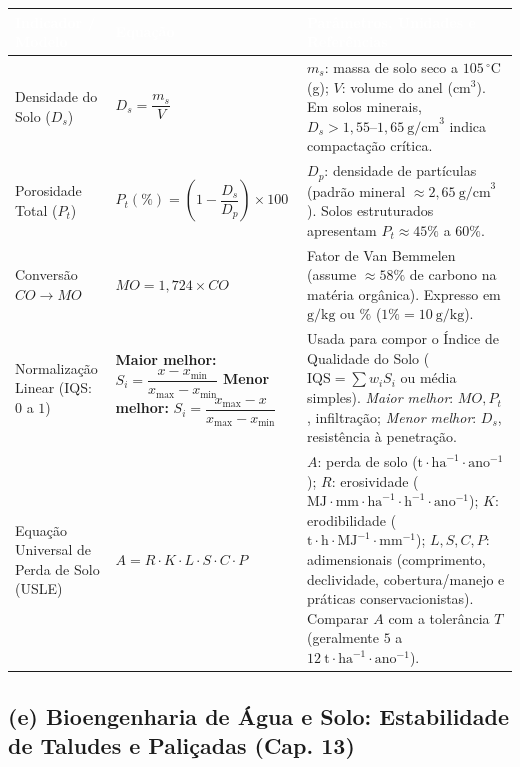 \begin{center}
\renewcommand{\arraystretch}{1.30}
\small
\begin{tabularx}{\textwidth}{@{}p{3.4cm} p{4.8cm} >{\raggedright\arraybackslash}X@{}}
  \toprule
  \rowcolor{uefsNavy}
  \textcolor{white}{\bfseries Indicador / Modelo} & \textcolor{white}{\bfseries Equação} & \textcolor{white}{\bfseries Parâmetros, Unidades e Referências} \\
  \midrule
  Densidade do Solo ($D_s$) & $D_s = \dfrac{m_s}{V}$ & $m_s$: massa de solo seco a $105\,^\circ\text{C}$ (g); $V$: volume do anel ($\text{cm}^3$). Em solos minerais, $D_s > 1,55\text{--}1,65\ \text{g/cm}^3$ indica compactação crítica. \\
  \rowcolor{bgGray}
  Porosidade Total ($P_t$) & $P_t(\%) = \left(1 - \dfrac{D_s}{D_p}\right)\times 100$ & $D_p$: densidade de partículas (padrão mineral $\approx 2,65\ \text{g/cm}^3$). Solos estruturados apresentam $P_t \approx 45\%$ a $60\%$. \\
  Conversão $CO \to MO$ & $MO = 1,724 \times CO$ & Fator de Van Bemmelen (assume $\approx 58\%$ de carbono na matéria orgânica). Expresso em $\text{g/kg}$ ou $\%$ ($1\% = 10\ \text{g/kg}$). \\
  \rowcolor{bgGray}
  Normalização Linear (IQS: $0$ a $1$) & \textbf{Maior melhor:} $S_i = \dfrac{x - x_{\min}}{x_{\max} - x_{\min}}$ \newline \textbf{Menor melhor:} $S_i = \dfrac{x_{\max} - x}{x_{\max} - x_{\min}}$ & Usada para compor o Índice de Qualidade do Solo ($\text{IQS} = \sum w_i S_i$ ou média simples). \textit{Maior melhor}: $MO, P_t$, infiltração; \textit{Menor melhor}: $D_s$, resistência à penetração. \\
  Equação Universal de Perda de Solo (USLE) & $A = R \cdot K \cdot L \cdot S \cdot C \cdot P$ & $A$: perda de solo ($\text{t}\cdot\text{ha}^{-1}\cdot\text{ano}^{-1}$); $R$: erosividade ($\text{MJ}\cdot\text{mm}\cdot\text{ha}^{-1}\cdot\text{h}^{-1}\cdot\text{ano}^{-1}$); $K$: erodibilidade ($\text{t}\cdot\text{h}\cdot\text{MJ}^{-1}\cdot\text{mm}^{-1}$); $L, S, C, P$: adimensionais (comprimento, declividade, cobertura/manejo e práticas conservacionistas). Comparar $A$ com a tolerância $T$ (geralmente $5$ a $12\ \text{t}\cdot\text{ha}^{-1}\cdot\text{ano}^{-1}$). \\
  \bottomrule
\end{tabularx}
\end{center}

\subsection*{(e) Bioengenharia de Água e Solo: Estabilidade de Taludes e Paliçadas (Cap. 13)}

